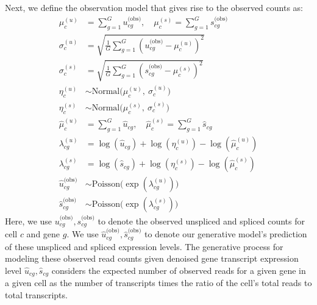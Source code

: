 \documentclass[
  sn-mathphys-num,
  lineno,
  twocolumn]{sn-jnl}
\begin{document}
Next, we define the observation model that gives rise to the observed
counts as: \begin{align}
  \mu^{(u)}_c &= \sum_{g=1}^G {u}^{\text{(obs)}}_{cg}, \quad \mu^{(s)}_c = \sum_{g=1}^G {s}^{\text{(obs)}}_{cg} \\
  \sigma^{(u)}_c &= \sqrt{\frac{1}{G} \sum_{g=1}^G \left( u_{cg}^{\text{(obs)}} - \mu^{(u)}_c \right)^2} \\
  \sigma^{(s)}_c &= \sqrt{\frac{1}{G} \sum_{g=1}^G \left( s_{cg}^{\text{(obs)}} - \mu^{(s)}_c \right)^2} \\
  \eta^{(u)}_c &\sim \text{Normal}\Big(\mu^{(u)}_c, \ \sigma^{(u)}_c\Big) \\
  \eta^{(s)}_c &\sim \text{Normal}\Big(\mu^{(s)}_c, \ \sigma^{(s)}_c\Big) \\
  \hat{\mu}^{(u)}_c &= \sum_{g=1}^G \hat{u}_{cg}, \quad \hat{\mu}^{(s)}_c = \sum_{g=1}^G \hat{s}_{cg} \\
  \lambda^{(u)}_{cg} &= \log(\hat{u}_{cg}) + \log(\eta^{(u)}_{c}) - \log(\hat{\mu}^{(u)}_c) \\
  \lambda^{(s)}_{cg} &= \log(\hat{s}_{cg}) + \log(\eta^{(s)}_{c}) - \log(\hat{\mu}^{(s)}_c) \\
  \hat{u}^{\text{(obs)}}_{cg} &\sim \text{Poisson}\Big(\exp (\lambda^{(u)}_{cg})\Big)   \label{eq-u-hat-obs} \\
  \hat{s}^{\text{(obs)}}_{cg} &\sim \text{Poisson}\Big(\exp (\lambda^{(s)}_{cg})\Big) \label{eq-s-hat-obs}
\end{align} Here, we use
\({u}^{\text{(obs)}}_{cg}, {s}^{\text{(obs)}}_{cg}\) to denote the
observed unspliced and spliced counts for cell \(c\) and gene \(g\). We
use \(\hat{u}^{\text{(obs)}}_{cg}, \hat{s}^{\text{(obs)}}_{cg}\) to
denote our generative model's prediction of these unspliced and spliced
expression levels. The generative process for modeling these observed
read counts given denoised gene transcript expression level
\(\hat{u}_{cg}, \hat{s}_{cg}\) considers the expected number of observed
reads for a given gene in a given cell as the number of transcripts
times the ratio of the cell's total reads to total transcripts.
\end{document}
